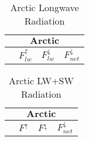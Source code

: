 \documentclass[10pt,twocolumn]{article}
\begin{document}
\begin{table}[h]
	\centering
	\caption{Arctic Longwave Radiation}
	\label{tab:alr}
	\begin{tabular}{lccc}
		\toprule
		\multicolumn{4}{c}{$\textbf{Arctic}$}\\
		\midrule
		& $F^\uparrow_{lw}$ & $F^\downarrow_{lw}$ & $F^\downarrow_{net}$\\
		\midrule
		
		\bottomrule
	\end{tabular}
	
\end{table}

\begin{table}[h]
	\centering
	\caption{Arctic LW+SW Radiation}
	\label{tab:acr}
	\begin{tabular}{lccc}
		\toprule
		\multicolumn{4}{c}{$\textbf{Arctic}$}\\
		\midrule
		& $F^\uparrow$ & $F^\downarrow$ & $F^\downarrow_{net}$\\
		\midrule
		
		\bottomrule
	\end{tabular}
	
\end{table}
\end{document}
